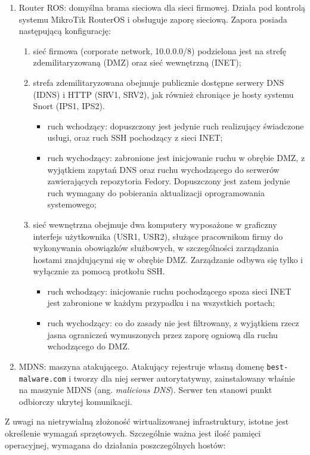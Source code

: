 \documentclass{eiti-raport}
\begin{document}
\begin{enumerate}
	\item Router ROS: domyślna brama sieciowa dla sieci firmowej. Działa pod kontrolą systemu MikroTik RouterOS i obsługuje zaporę sieciową. Zapora posiada następującą konfigurację:
	\begin{enumerate}
		\item sieć firmowa (corporate network, 10.0.0.0/8) podzielona jest na strefę zdemilitaryzowaną (DMZ) oraz sieć wewnętrzną (INET);
		\item strefa zdemilitaryzowana obejmuje publicznie dostępne serwery DNS (IDNS) i HTTP (SRV1, SRV2), jak również chroniące je hosty systemu Snort (IPS1, IPS2).
		\begin{itemize}
			\item ruch wchodzący: dopuszczony jest jedynie ruch realizujący świadczone usługi, oraz ruch SSH pochodzący z sieci INET;
			\item ruch wychodzący: zabronione jest inicjowanie ruchu w obrębie DMZ, z wyjątkiem zapytań DNS oraz ruchu wychodzącego do serwerów zawierających repozytoria Fedory. Dopuszczony jest zatem jedynie ruch wymagany do pobierania aktualizacji oprogramowania systemowego;
		\end{itemize}
		\item sieć wewnętrzna obejmuje dwa komputery wyposażone w graficzny interfejs użytkownika (USR1, USR2), służące pracownikom firmy do wykonywania obowiązków służbowych, w szczególności zarządzania hostami znajdującymi się w obrębie DMZ. Zarządzanie odbywa się tylko i wyłącznie za pomocą protkołu SSH.
		\begin{itemize}
			\item ruch wchodzący: inicjowanie ruchu pochodzącego spoza sieci INET jest zabronione w każdym przypadku i na wszystkich portach;
			\item ruch wychodzący: co do zasady nie jest filtrowany, z wyjątkiem rzecz jasna ograniczeń wymuszonych przez zaporę ogniową dla ruchu wchodzącego do DMZ.
		\end{itemize}
	\end{enumerate}
	\item MDNS: maszyna atakującego. Atakujący rejestruje własną domenę \texttt{best-malware.com} i tworzy dla niej serwer autorytatywny, zainstalowany właśnie na maszynie MDNS (ang. \textit{malicious DNS}). Serwer ten stanowi punkt odbiorczy ukrytej komunikacji. 
\end{enumerate}
Z uwagi na nietrywialną złożoność wirtualizowanej infrastruktury, istotne jest określenie wymagań sprzętowych. Szczególnie ważna jest ilość pamięci operacyjnej, wymagana do działania poszczególnych hostów:
\end{document}
